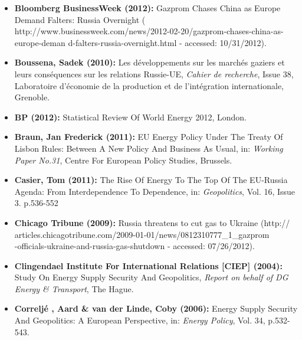 \documentclass[11pt,a4paper,english]{scrreprt}
\begin{document}
\begin{itemize}
\item [\Rectsteel] \textbf{Bloomberg BusinessWeek (2012):} Gazprom Chases China
as Europe Demand Falters: Russia Overnight (\textcolor{dunkelgrau.80}{
http://www.businessweek.com/news/2012-02-20/gazprom-chases-china-as-europe-deman
d-falters-russia-overnight.html} - accessed: 10/31/2012).



	\item [\Rectsteel] \textbf{Boussena, Sadek (2010):} Les
d\'{e}veloppements sur les march\'{e}s gaziers et leurs cons\'{e}quences sur les
relations Russie-UE, \textsl{Cahier de recherche}, Issue 38, Laboratoire
d'\'{e}conomie de la production et de l'int\'{e}gration internationale,
Grenoble.



	\item [\Rectsteel] \textbf{BP (2012):} Statistical Review Of World
Energy 2012, London.



	\item [\Rectsteel] \textbf{Braun, Jan Frederick (2011):} EU Energy
Policy Under The Treaty Of Lisbon Rules: Between A New Policy And Business As
Usual, in: \textsl{Working Paper No.31}, Centre For European Policy Studies,
Brussels.



	\item [\Rectsteel] \textbf{Casier, Tom (2011):} The Rise Of Energy To
The Top Of The EU-Russia Agenda: From Interdependence To Dependence, in:
\textsl{Geopolitics}, Vol. 16, Issue 3. p.536-552



\item [\Rectsteel] \textbf{Chicago Tribune (2009):} Russia threatens to cut gas
to Ukraine (\textcolor{dunkelgrau.80}{http:// \\
articles.chicagotribune.com/2009-01-01/news/0812310777\_1\_gazprom \\
-officials-ukraine-and-russia-gas-shutdown} - accessed: 07/26/2012).



	\item [\Rectsteel] \textbf{Clingendael Institute For International
Relations [CIEP] (2004):} Study On Energy Supply Security And Geopolitics, 
\textsl{Report on behalf of DG Energy \& Transport}, The Hague.



	\item [\Rectsteel] \textbf{Correlj\'{e} , Aard \& van der Linde,
Coby (2006):} Energy Supply Security And Geopolitics: A European Perspective,
in: \textsl{Energy Policy}, Vol. 34, p.532-543.




\end{itemize}
\end{document}
